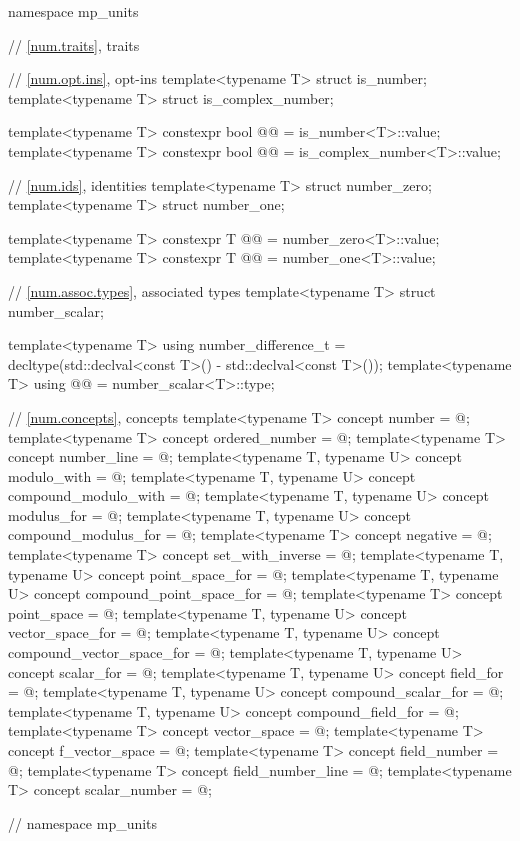 \begin{codeblock}
namespace mp_units {

// \ref{num.traits}, traits

// \ref{num.opt.ins},  opt-ins
template<typename T>
struct is_number;
template<typename T>
struct is_complex_number;

template<typename T>
constexpr bool @@ = is_number<T>::value;
template<typename T>
constexpr bool @@ = is_complex_number<T>::value;

// \ref{num.ids}, identities
template<typename T>
struct number_zero;
template<typename T>
struct number_one;

template<typename T>
constexpr T @@ = number_zero<T>::value;
template<typename T>
constexpr T @@ = number_one<T>::value;

// \ref{num.assoc.types}, associated types
template<typename T>
struct number_scalar;

template<typename T>
using number_difference_t = decltype(std::declval<const T>() - std::declval<const T>());
template<typename T>
using @@ = number_scalar<T>::type;

// \ref{num.concepts}, concepts
template<typename T>
concept number = @\seebelow@;
template<typename T>
concept ordered_number = @\seebelow@;
template<typename T>
concept number_line = @\seebelow@;
template<typename T, typename U>
concept modulo_with = @\seebelow@;
template<typename T, typename U>
concept compound_modulo_with = @\seebelow@;
template<typename T, typename U>
concept modulus_for = @\seebelow@;
template<typename T, typename U>
concept compound_modulus_for = @\seebelow@;
template<typename T>
concept negative = @\seebelow@;
template<typename T>
concept set_with_inverse = @\seebelow@;
template<typename T, typename U>
concept point_space_for = @\seebelow@;
template<typename T, typename U>
concept compound_point_space_for = @\seebelow@;
template<typename T>
concept point_space = @\seebelow@;
template<typename T, typename U>
concept vector_space_for = @\seebelow@;
template<typename T, typename U>
concept compound_vector_space_for = @\seebelow@;
template<typename T, typename U>
concept scalar_for = @\seebelow@;
template<typename T, typename U>
concept field_for = @\seebelow@;
template<typename T, typename U>
concept compound_scalar_for = @\seebelow@;
template<typename T, typename U>
concept compound_field_for = @\seebelow@;
template<typename T>
concept vector_space = @\seebelow@;
template<typename T>
concept f_vector_space = @\seebelow@;
template<typename T>
concept field_number = @\seebelow@;
template<typename T>
concept field_number_line = @\seebelow@;
template<typename T>
concept scalar_number = @\seebelow@;

}  // namespace mp_units
\end{codeblock}

